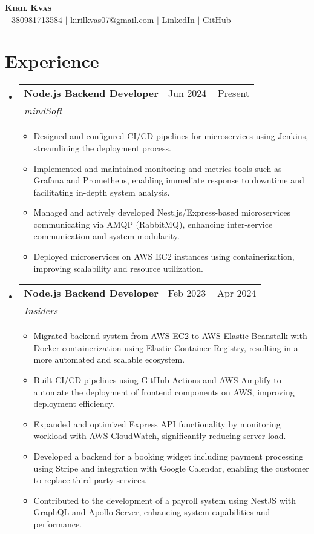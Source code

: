 \documentclass[letterpaper,11pt]{article}
\makeatletter
\newcommand{\resumeItem}[1]{
  \item\small{
    {#1 \vspace{-2pt}}
  }
}
\newcommand{\resumeSubheading}[4]{
  \vspace{-2pt}\item
    \begin{tabular*}{0.97\textwidth}[t]{l@{\extracolsep{\fill}}r}
      \textbf{#1} & #2 \\
      \textit{\small#3} & \textit{\small #4} \\
    \end{tabular*}\vspace{-7pt}
}
\newcommand{\resumeSubHeadingListStart}{\begin{itemize}[leftmargin=0.15in, label={}]}
\newcommand{\resumeSubHeadingListEnd}{\end{itemize}}
\newcommand{\resumeItemListStart}{\begin{itemize}}
\newcommand{\resumeItemListEnd}{\end{itemize}\vspace{-5pt}}
\makeatother
\begin{document}
\begin{center}
    \textbf{\Huge \scshape Kiril Kvas} \\ \vspace{1pt}
    \small +380981713584 $|$ \href{mailto:kirilkvas07@gmail.com}{\underline{kirilkvas07@gmail.com}} $|$ 
    \href{https://www.linkedin.com/in/kiril-kvas-999154239/}{\underline{LinkedIn}} $|$
    \href{https://github.com/rillsvai}{\underline{GitHub}}
\end{center}

\section{Experience}
\resumeSubHeadingListStart
    \resumeSubheading
      {Node.js Backend Developer}{Jun 2024 -- Present}
      {mindSoft}{}
      \resumeItemListStart
        \resumeItem{Designed and configured CI/CD pipelines for microservices using Jenkins, streamlining the deployment process.}
        \resumeItem{Implemented and maintained monitoring and metrics tools such as Grafana and Prometheus, enabling immediate response to downtime and facilitating in-depth system analysis.}
        \resumeItem{Managed and actively developed Nest.js/Express-based microservices communicating via AMQP (RabbitMQ), enhancing inter-service communication and system modularity.}
        \resumeItem{Deployed microservices on AWS EC2 instances using containerization, improving scalability and resource utilization.}
      \resumeItemListEnd
\resumeSubHeadingListEnd

\resumeSubHeadingListStart
    \resumeSubheading
      {Node.js Backend Developer}{Feb 2023 -- Apr 2024}
      {Insiders}{}
      \resumeItemListStart
            \resumeItem{Migrated backend system from AWS EC2 to AWS Elastic Beanstalk with Docker containerization using Elastic Container Registry, resulting in a more automated and scalable ecosystem.}
            \resumeItem{Built CI/CD pipelines using GitHub Actions and AWS Amplify to automate the deployment of frontend components on AWS, improving deployment efficiency.}
            \resumeItem{Expanded and optimized Express API functionality by monitoring workload with AWS CloudWatch, significantly reducing server load.}
            \resumeItem{Developed a backend for a booking widget including payment processing using Stripe and integration with Google Calendar, enabling the customer to replace third-party services.}
            \resumeItem{Contributed to the development of a payroll system using NestJS with GraphQL and Apollo Server, enhancing system capabilities and performance.}
      \resumeItemListEnd
\resumeSubHeadingListEnd
\end{document}
